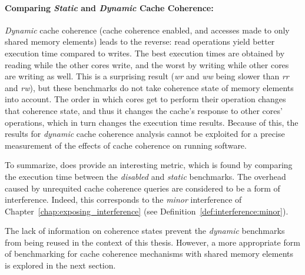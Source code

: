 \paragraph{Comparing \textit{Static} and \textit{Dynamic} Cache Coherence:}
\textit{Dynamic} cache coherence (cache coherence enabled, and accesses
made to only shared memory elements) leads to the reverse: read operations yield
better execution time compared to writes. The best execution times are obtained by reading
while the other cores write, and the worst by writing while other cores are
writing as well. This is a surprising result (\textit{wr} and \textit{ww} being
slower than \textit{rr} and \textit{rw}), but these benchmarks do not take
coherence state of memory elements into account. The order in which cores get to
perform their operation changes that coherence state, and thus it changes the
cache's response  to other cores' operations, which in turn changes the execution time
results. Because of this, the results for \textit{dynamic} cache coherence
analysis cannot be exploited for a precise measurement of the effects of cache
coherence on running software.

To summarize, \cite{Nowotsch2012LeveragingMC} does provide an interesting
metric, which is found by comparing the execution time between the \textit{disabled}
and \textit{static} benchmarks. The overhead caused by unrequited cache
coherence queries are considered to be a form of interference.  Indeed, this
corresponds to the \textit{minor} interference of
Chapter~\ref{chap:exposing_interference} (see
Definition~\ref{def:interference:minor}).

The lack of information on coherence states prevent the \textit{dynamic}
benchmarks from being reused in the context of this thesis. However, a more
appropriate form of benchmarking for cache coherence mechanisms with shared
memory elements is explored in the next section.

\stopallthesefloats
